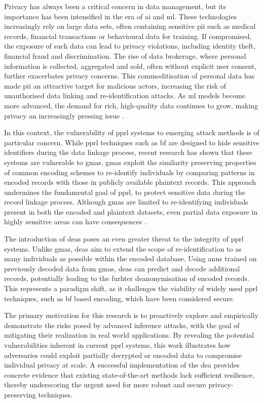 Privacy has always been a critical concern in data management, but its importance has been intensified in the era of \ac{ai} and \ac{ml}.
These technologies increasingly rely on large data sets, often containing sensitive \ac{pii} such as medical records, financial transactions or behavioural data for training. If compromised, the exposure of such data can lead to privacy violations, including identity theft, financial fraud and discrimination.
The rise of data brokerage, where personal information is collected, aggregated and sold, often without explicit user consent, further exacerbates privacy concerns.
This commoditisation of personal data has made \ac{pii} an attractive target for malicious actors, increasing the risk of unauthorised data linking and re-identification attacks.
As \ac{ml} models become more advanced, the demand for rich, high-quality data continues to grow, making privacy an increasingly pressing issue \cite{king2024rethinking, manheim2019artificial}.

In this context, the vulnerability of \ac{pprl} systems to emerging attack methods is of particular concern.
While \ac{pprl} techniques such as \ac{bf} are designed to hide sensitive identifiers during the data linkage process, recent research has shown that these systems are vulnerable to \ac{gma}s.
\ac{gma}s exploit the similarity preserving properties of common encoding schemes to re-identify individuals by comparing patterns in encoded records with those in publicly available plaintext records.
This approach undermines the fundamental goal of \ac{pprl}, to protect sensitive data during the record linkage process.
Although \ac{gma}s are limited to re-identifying individuals present in both the encoded and plaintext datasets, even partial data exposure in highly sensitive areas can have consequences \cite{schaefer2024,vidanage2020graph}.

The introduction of \ac{dea}s poses an even greater threat to the integrity of \ac{pprl} systems.
Unlike \ac{gma}s, \ac{dea}s aim to extend the scope of re-identification to as many individuals as possible within the encoded database.
Using \ac{ann}s trained on previously decoded data from \ac{gma}s, \ac{dea}s can predict and decode additional records, potentially leading to the furhter deanonymisation of encoded records.
This represents a paradigm shift, as it challenges the viability of widely used \ac{pprl} techniques, such as \ac{bf} based encoding, which have been considered secure.

The primary motivation for this research is to proactively explore and empirically demonstrate the risks posed by advanced inference attacks, with the goal of mitigating their realization in real world applications.
By revealing the potential vulnerabilities inherent in current \ac{pprl} systems, this work illustrates how adversaries could exploit partially decrypted or encoded data to compromise individual privacy at scale.
A successful implementation of the \ac{dea} provides concrete evidence that existing state-of-the-art methods lack sufficient resilience, thereby underscoring the urgent need for more robust and secure privacy-preserving techniques.


